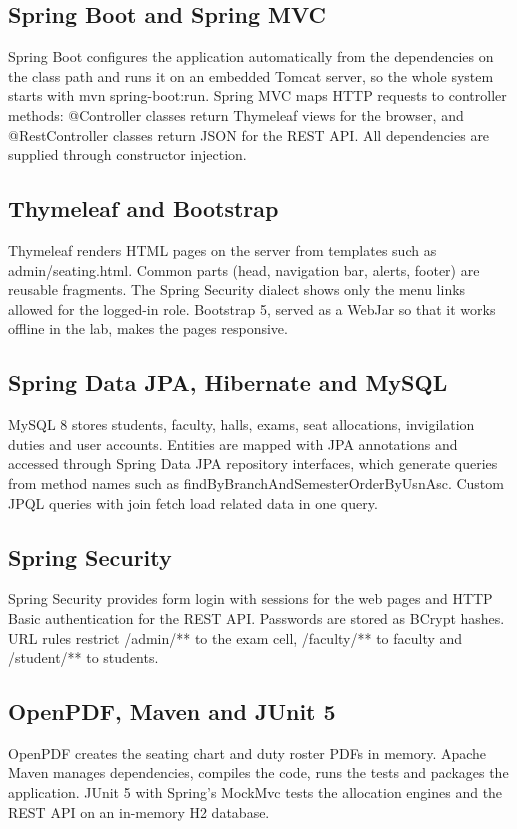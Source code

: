 \documentclass[12pt,letterpaper]{article}
\renewcommand{\texttt}[1]{#1}
\begin{document}
\subsection{Spring Boot and Spring MVC}
Spring Boot configures the application automatically from the dependencies on the class path and runs it on an embedded Tomcat server, so the whole system starts with \texttt{mvn spring-boot:run}. Spring MVC maps HTTP requests to controller methods: \texttt{@Controller} classes return Thymeleaf views for the browser, and \texttt{@RestController} classes return JSON for the REST API. All dependencies are supplied through constructor injection.

\subsection{Thymeleaf and Bootstrap}
Thymeleaf renders HTML pages on the server from templates such as \texttt{admin/seating.html}. Common parts (head, navigation bar, alerts, footer) are reusable fragments. The Spring Security dialect shows only the menu links allowed for the logged-in role. Bootstrap 5, served as a WebJar so that it works offline in the lab, makes the pages responsive.

\subsection{Spring Data JPA, Hibernate and MySQL}
MySQL 8 stores students, faculty, halls, exams, seat allocations, invigilation duties and user accounts. Entities are mapped with JPA annotations and accessed through Spring Data JPA repository interfaces, which generate queries from method names such as \texttt{findByBranchAndSemesterOrderByUsnAsc}. Custom JPQL queries with \texttt{join fetch} load related data in one query.

\subsection{Spring Security}
Spring Security provides form login with sessions for the web pages and HTTP Basic authentication for the REST API. Passwords are stored as BCrypt hashes. URL rules restrict \texttt{/admin/**} to the exam cell, \texttt{/faculty/**} to faculty and \texttt{/student/**} to students.

\subsection{OpenPDF, Maven and JUnit 5}
OpenPDF creates the seating chart and duty roster PDFs in memory. Apache Maven manages dependencies, compiles the code, runs the tests and packages the application. JUnit 5 with Spring's MockMvc tests the allocation engines and the REST API on an in-memory H2 database.
\end{document}
